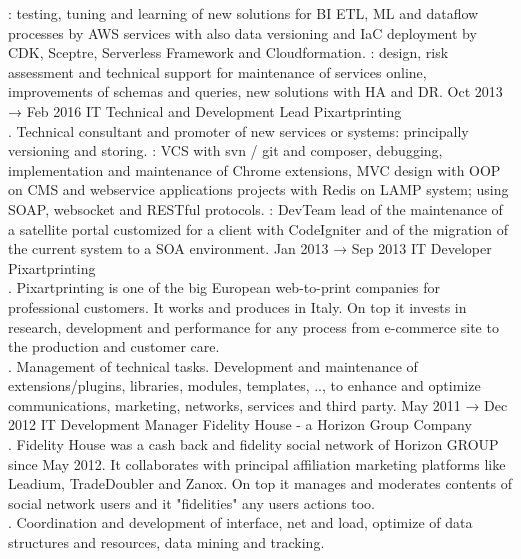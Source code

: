 \documentclass[9pt]{stackoverflow-upgraded-version} %
\begin{document}
\begin{entrylist}
{		: testing, tuning and learning of new solutions for BI ETL, ML and dataflow processes by AWS services with also data versioning and IaC deployment by CDK, Sceptre, Serverless Framework and Cloudformation.
		: design, risk assessment and technical support for maintenance of services online, improvements of schemas and queries, new solutions with HA and DR.}
	\entry
		{Oct 2013 → Feb 2016}
		{IT Technical and Development Lead}
		{Pixartprinting}
		{\\
		. Technical consultant and promoter of new services or systems: principally versioning and storing. :
		VCS with svn / git and composer, debugging, implementation and maintenance of Chrome extensions, MVC design with OOP
		on CMS and webservice applications projects with Redis on LAMP system; using SOAP, websocket and RESTful protocols.
		: DevTeam lead of the maintenance of a satellite portal customized for a client with CodeIgniter and of the migration of
		the current system to a SOA environment.}
	\entry
		{Jan 2013 → Sep 2013}
		{IT Developer}
		{Pixartprinting}
		{\\
		. Pixartprinting is one of the big European web-to-print companies for professional customers. It works
		and produces in Italy. On top it invests in research, development and performance for any process from e-commerce site to
		the production and customer care.\\
		. Management of technical tasks. Development and maintenance of extensions/plugins, libraries, modules,
		templates, .., to enhance and optimize communications, marketing, networks, services and third party.}
	\entry
		{May 2011 → Dec 2012}
		{IT Development Manager}
		{Fidelity House - a Horizon Group Company}
		{\\
		. Fidelity House was a cash back and fidelity social network of Horizon GROUP since May 2012. It
		collaborates with principal affiliation marketing platforms like Leadium, TradeDoubler and Zanox. On top it manages and
		moderates contents of social network users and it "fidelities" any users actions too.\\
		. Coordination and development of interface, net and load, optimize of data structures and resources, data mining and tracking.
}
\end{entrylist}
\end{document}
